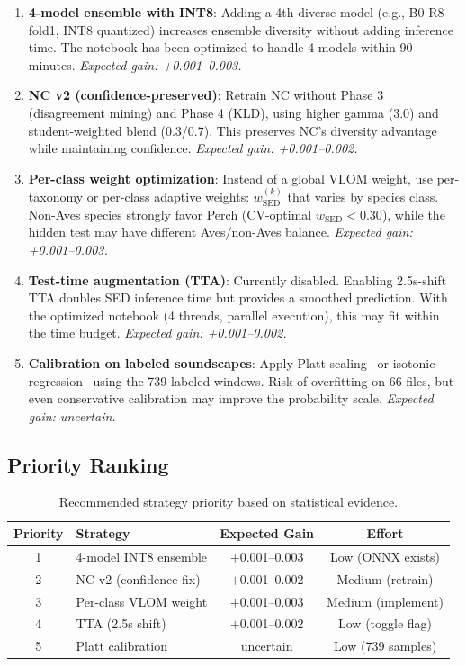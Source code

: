 \documentclass[a4paper,11pt]{article}
\begin{document}
\begin{enumerate}
\item \textbf{4-model ensemble with INT8}: Adding a 4th diverse model (e.g., B0 R8 fold1, INT8 quantized) increases ensemble diversity without adding inference time. The notebook has been optimized to handle 4 models within 90 minutes. \emph{Expected gain: +0.001--0.003.}

\item \textbf{NC v2 (confidence-preserved)}: Retrain NC without Phase 3 (disagreement mining) and Phase 4 (KLD), using higher gamma (3.0) and student-weighted blend (0.3/0.7). This preserves NC's diversity advantage while maintaining confidence. \emph{Expected gain: +0.001--0.002.}

\item \textbf{Per-class weight optimization}: Instead of a global VLOM weight, use per-taxonomy or per-class adaptive weights: $w_\text{SED}^{(k)}$ that varies by species class. Non-Aves species strongly favor Perch (CV-optimal $w_\text{SED} < 0.30$), while the hidden test may have different Aves/non-Aves balance. \emph{Expected gain: +0.001--0.003.}

\item \textbf{Test-time augmentation (TTA)}: Currently disabled. Enabling 2.5s-shift TTA doubles SED inference time but provides a smoothed prediction. With the optimized notebook (4 threads, parallel execution), this may fit within the time budget. \emph{Expected gain: +0.001--0.002.}

\item \textbf{Calibration on labeled soundscapes}: Apply Platt scaling~\citep{platt1999probabilistic} or isotonic regression~\citep{zadrozny2002transforming} using the 739 labeled windows. Risk of overfitting on 66 files, but even conservative calibration may improve the probability scale. \emph{Expected gain: uncertain.}
\end{enumerate}

\subsection{Priority Ranking}

\begin{table}[h]
\centering
\caption{Recommended strategy priority based on statistical evidence.}
\begin{tabular}{clcc}
\toprule
Priority & Strategy & Expected Gain & Effort \\
\midrule
1 & 4-model INT8 ensemble & $+$0.001--0.003 & Low (ONNX exists) \\
2 & NC v2 (confidence fix) & $+$0.001--0.002 & Medium (retrain) \\
3 & Per-class VLOM weight & $+$0.001--0.003 & Medium (implement) \\
4 & TTA (2.5s shift) & $+$0.001--0.002 & Low (toggle flag) \\
5 & Platt calibration & uncertain & Low (739 samples) \\
\bottomrule
\end{tabular}
\label{tab:priority}
\end{table}
\end{document}
